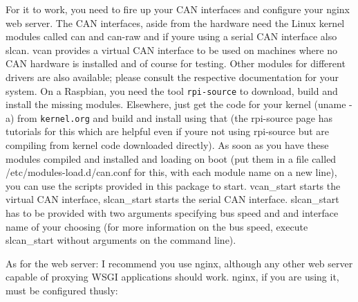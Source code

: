 For it to work, you need to fire up your C\+AN interfaces and configure your {\ttfamily nginx} web server. The C\+AN interfaces, aside from the hardware need the Linux kernel modules called {\ttfamily can} and {\ttfamily can-\/raw} and if you\textquotesingle{}re using a serial C\+AN interface also {\ttfamily slcan}. {\ttfamily vcan} provides a virtual C\+AN interface to be used on machines where no C\+AN hardware is installed and of course for testing. Other modules for different drivers are also available; please consult the respective documentation for your system. On a Raspbian, you need the tool {\tt {\ttfamily rpi-\/source}} to download, build and install the missing modules. Elsewhere, just get the code for your kernel ({\ttfamily uname -\/a}) from {\tt kernel.\+org} and build and install using that (the {\ttfamily rpi-\/source} page has tutorials for this which are helpful even if you\textquotesingle{}re not using {\ttfamily rpi-\/source} but are compiling from kernel code downloaded directly). As soon as you have these modules compiled and installed and loading on boot (put them in a file called {\ttfamily /etc/modules-\/load.d/can.\+conf} for this, with each module name on a new line), you can use the scripts provided in this package to start. {\ttfamily vcan\+\_\+start} starts the virtual C\+AN interface, {\ttfamily slcan\+\_\+start} starts the serial C\+AN interface. {\ttfamily slcan\+\_\+start} has to be provided with two arguments specifying bus speed and and interface name of your choosing (for more information on the bus speed, execute {\ttfamily slcan\+\_\+start} without arguments on the command line).

As for the web server\+: I recommend you use {\ttfamily nginx}, although any other web server capable of proxying W\+S\+GI applications should work. {\ttfamily nginx}, if you are using it, must be configured thusly\+: 



